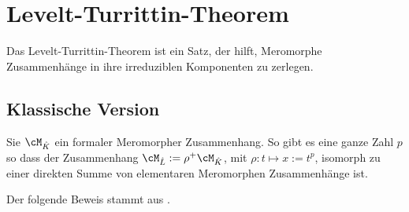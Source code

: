 \chapter{Levelt-\!Turrittin-\!Theorem}
Das Levelt-Turrittin-Theorem ist ein Satz, der hilft, Meromorphe Zusammenhänge
in ihre irreduziblen Komponenten zu zerlegen.

\section{Klassische Version}
\begin{thm}
\cite[Thm 5.4.7]{sabbah_cimpa90}
Sie $\cM_{\hat K}$ ein formaler Meromorpher Zusammenhang. So gibt es eine
ganze Zahl $p$ so dass der Zusammenhang $\cM_{\hat L}:=\rho^+\cM_{\hat K}$,
mit $\rho:t\mapsto x:=t^p$, isomorph zu einer direkten Summe von elementaren
Meromorphen Zusammenhänge
ist.
\end{thm}
Der folgende Beweis stammt aus \cite[Seite 35]{sabbah_cimpa90}.
